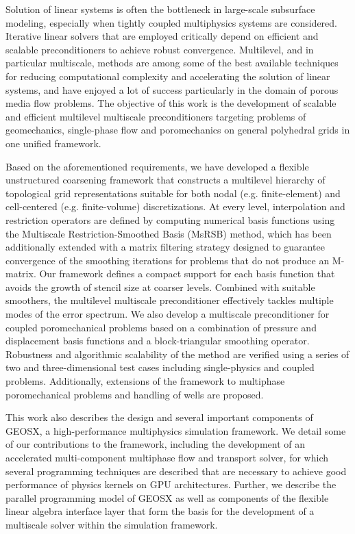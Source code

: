 
Solution of linear systems is often the bottleneck in large-scale subsurface modeling, especially when tightly coupled multiphysics systems are considered.   Iterative linear solvers that are employed critically depend on efficient and scalable preconditioners to achieve robust convergence.   Multilevel, and in particular multiscale, methods are among some of the best available techniques for reducing computational complexity and accelerating  the solution of linear systems, and have enjoyed a lot of success particularly in the domain of porous media flow problems.   The objective of this work is the development of scalable and efficient multilevel multiscale preconditioners targeting problems of geomechanics, single-phase flow and poromechanics on general polyhedral grids in one unified framework.

Based on the aforementioned requirements, we have developed a flexible unstructured coarsening framework that constructs a multilevel hierarchy of topological grid representations suitable for both nodal (e.g. finite-element) and cell-centered (e.g. finite-volume) discretizations.   At every level, interpolation and restriction operators are defined by computing numerical basis functions using the Multiscale Restriction-Smoothed Basis (MsRSB) method, which has been additionally extended with a matrix filtering strategy designed to guarantee convergence of the smoothing iterations for problems that do not produce an M-matrix.   Our framework defines a compact support for each basis function that avoids the growth of stencil size at coarser levels.   Combined with suitable smoothers, the multilevel multiscale preconditioner effectively tackles multiple modes of the error spectrum.   We also develop a multiscale preconditioner for coupled poromechanical problems based on a combination of pressure and displacement basis functions and a block-triangular smoothing operator.    Robustness and algorithmic scalability of the method are verified using a series of two and three-dimensional test cases including single-physics and coupled problems.   Additionally, extensions of the framework to multiphase poromechanical problems and handling of wells are proposed.

This work also describes the design and several important components of GEOSX, a high-performance multiphysics simulation framework.   We detail some of our contributions to the framework, including the development of an accelerated multi-component multiphase flow and transport solver, for which several programming techniques are described that are necessary to achieve good performance of physics kernels on GPU architectures.   Further, we describe the parallel programming model of GEOSX as well as components of the flexible linear algebra interface layer that form the basis for the development of a multiscale solver within the simulation framework.


